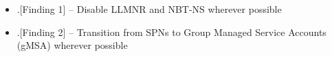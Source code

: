 \begin{itemize}
\item .[Finding 1] – Disable LLMNR and NBT-NS wherever possible
\item .[Finding 2] – Transition from SPNs to Group Managed Service Accounts (gMSA) wherever possible
\end{itemize}
